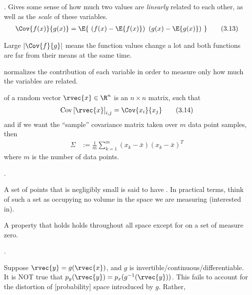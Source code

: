 \documentclass[11pt]{article}
\newcommand\myspace[1][]{\vspace{#1\bigskipamount}}
\newcommand\p{\Needspace{10\baselineskip} \noindent}
\newcommand\tlab[1]{\tag{#1}\label{#1}}
\begin{document}
\myspace
\p {}. Gives some sense of how much two values are \textit{linearly} related to each other, as well as the \textit{scale} of these variables.
\begin{align}
\Cov{f(x)}{g(x)} = \E{~\left(f(x) - \E{f(x)}\right)~\left(g(x) - \E{g(x)}\right)~} \tlab{3.13}
\end{align}
\begin{compactitem}[$\rightarrow$]
	\item Large $|\Cov{f}{g}|$ means the function values change a lot and both functions are far from their means at the same time.
	\item {} normalizes the contribution of each variable in order to measure only how much the variables are related.
\end{compactitem}

\myspace
\p {} of a random vector $\rvec{x} \in \R^{n}$ is an $n \times n$ matrix, such that
\begin{align}
\mathrm{Cov}\left[\rvec{x}\right]_{i,j}   = \Cov{x_i}{x_j} \tlab{3.14}
\end{align}
and if we want the ``sample'' covariance matrix taken over $m$ data point samples, then
\begin{align}
\Sigma &:= \frac{1}{m} \sum_{k = 1}^{m} (x_k - \bar x)(x_k - \bar x)^T
\end{align}
where $m$ is the number of data points.

\myspace
\p {}. 
\begin{compactitem}
	\item A set of points that is negligibly small is said to have . In practical terms, think of such a set as occupying no volume in the space we are measuring (interested in). 
	\item A property that holds  holds throughout all space except for on a set of measure zero.
\end{compactitem}

\myspace
\p {}. 
\begin{compactitem}
	\item {} Suppose $\rvec{y} = g(\rvec{x})$, and $g$ is invertible/continuous/differentiable. It is NOT true that $p_y(\rvec{y}) = p_x(g^{-1}(\rvec{y}))$. This fails to account for the distortion of [probability] space introduced by $g$. Rather, 
	\graybox{
		p_x(\rvec{x}) &= p_y(g(\rvec{x})) \bigg| \pderiv{g(\rvec{x})}{\rvec{x}}\bigg| \tlab{3.47}
	}
\end{compactitem}
\end{document}
